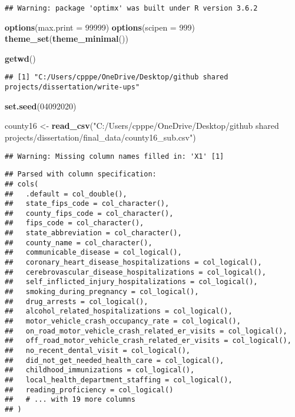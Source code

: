 \documentclass[
]{article}
\newenvironment{Shaded}{\begin{snugshade}}{\end{snugshade}}
\newcommand{\DataTypeTok}[1]{\textcolor[rgb]{0.13,0.29,0.53}{#1}}
\newcommand{\DecValTok}[1]{\textcolor[rgb]{0.00,0.00,0.81}{#1}}
\newcommand{\KeywordTok}[1]{\textcolor[rgb]{0.13,0.29,0.53}{\textbf{#1}}}
\newcommand{\NormalTok}[1]{#1}
\newcommand{\StringTok}[1]{\textcolor[rgb]{0.31,0.60,0.02}{#1}}
\begin{document}
\begin{verbatim}
## Warning: package 'optimx' was built under R version 3.6.2
\end{verbatim}

\begin{Shaded}
\begin{Highlighting}[]
\KeywordTok{options}\NormalTok{(}\DataTypeTok{max.print =} \DecValTok{99999}\NormalTok{)}
\KeywordTok{options}\NormalTok{(}\DataTypeTok{scipen =} \DecValTok{999}\NormalTok{)}
\KeywordTok{theme_set}\NormalTok{(}\KeywordTok{theme_minimal}\NormalTok{())}


\KeywordTok{getwd}\NormalTok{()}
\end{Highlighting}
\end{Shaded}

\begin{verbatim}
## [1] "C:/Users/cpppe/OneDrive/Desktop/github shared projects/dissertation/write-ups"
\end{verbatim}

\begin{Shaded}
\begin{Highlighting}[]
\KeywordTok{set.seed}\NormalTok{(}\DecValTok{04092020}\NormalTok{)}
\end{Highlighting}
\end{Shaded}

\begin{Shaded}
\begin{Highlighting}[]
\NormalTok{county16 <-}\StringTok{ }\KeywordTok{read_csv}\NormalTok{(}\StringTok{"C:/Users/cpppe/OneDrive/Desktop/github shared projects/dissertation/final_data/county16_sub.csv"}\NormalTok{)}
\end{Highlighting}
\end{Shaded}

\begin{verbatim}
## Warning: Missing column names filled in: 'X1' [1]
\end{verbatim}

\begin{verbatim}
## Parsed with column specification:
## cols(
##   .default = col_double(),
##   state_fips_code = col_character(),
##   county_fips_code = col_character(),
##   fips_code = col_character(),
##   state_abbreviation = col_character(),
##   county_name = col_character(),
##   communicable_disease = col_logical(),
##   coronary_heart_disease_hospitalizations = col_logical(),
##   cerebrovascular_disease_hospitalizations = col_logical(),
##   self_inflicted_injury_hospitalizations = col_logical(),
##   smoking_during_pregnancy = col_logical(),
##   drug_arrests = col_logical(),
##   alcohol_related_hospitalizations = col_logical(),
##   motor_vehicle_crash_occupancy_rate = col_logical(),
##   on_road_motor_vehicle_crash_related_er_visits = col_logical(),
##   off_road_motor_vehicle_crash_related_er_visits = col_logical(),
##   no_recent_dental_visit = col_logical(),
##   did_not_get_needed_health_care = col_logical(),
##   childhood_immunizations = col_logical(),
##   local_health_department_staffing = col_logical(),
##   reading_proficiency = col_logical()
##   # ... with 19 more columns
## )
\end{verbatim}
\end{document}

